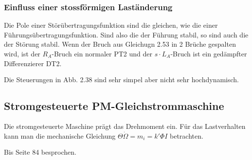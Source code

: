 \documentclass[a4paper]{article}
\begin{document}
\subsubsection*{Einfluss einer stossförmigen Laständerung}
Die Pole einer Störübertragungsfunktion sind die gleichen, wie die einer Führungsübertragungsfunktion. Sind also die der Führung stabil, so sind auch die der Störung stabil.\newline
Wenn der Bruch aus Gleichugn 2.53 in 2 Brüche gespalten wird, ist der $R_{A}$-Bruch ein normaler PT2 und der $s\cdot L_{A}$-Bruch ist ein gedämpfter Differenzierer DT2.

Die Steuerungen in Abb. 2.38 sind sehr simpel aber nicht sehr hochdynamisch.

\subsection*{Stromgesteuerte PM-Gleichstrommaschine}
Die stromgesteuerte Maschine prägt das Drehmoment ein.\newline
Für das Lastverhalten kann man die mechanische Gleichung $\Theta \dot\Omega=m_{i}=k'\Phi I$ betrachten.


Bis Seite 84 besprochen.
\end{document}
